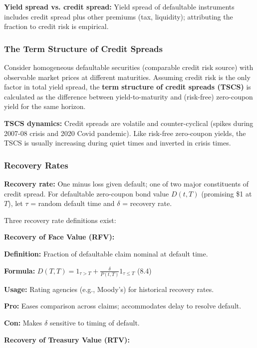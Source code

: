 \documentclass[12pt,a4paper]{article}
\begin{document}
\textbf{Yield spread vs. credit spread:} Yield spread of defaultable instruments includes credit spread plus other premiums (tax, liquidity); attributing the fraction to credit risk is empirical.

\subsubsection{The Term Structure of Credit Spreads}

Consider homogeneous defaultable securities (comparable credit risk source) with observable market prices at different maturities. Assuming credit risk is the only factor in total yield spread, the \textbf{term structure of credit spreads (TSCS)} is calculated as the difference between yield-to-maturity and (risk-free) zero-coupon yield for the same horizon.

\textbf{TSCS dynamics:} Credit spreads are volatile and counter-cyclical (spikes during 2007-08 crisis and 2020 Covid pandemic). Like risk-free zero-coupon yields, the TSCS is usually increasing during quiet times and inverted in crisis times.

\subsubsection{Recovery Rates}

\textbf{Recovery rate:} One minus loss given default; one of two major constituents of credit spread. For defaultable zero-coupon bond value $D(t,T)$ (promising \$1 at $T$), let $\tau$ = random default time and $\delta$ = recovery rate.

Three recovery rate definitions exist:

\vspace{0.3em}
\noindent\textbf{Recovery of Face Value (RFV):}

\textbf{Definition:} Fraction of defaultable claim nominal at default time.

\textbf{Formula:} $D(T,T) = 1_{\tau>T} + \frac{\delta}{P(t,T)} 1_{\tau \leq T}$ \quad (8.4)

\textbf{Usage:} Rating agencies (e.g., Moody's) for historical recovery rates.

\textbf{Pro:} Eases comparison across claims; accommodates delay to resolve default.

\textbf{Con:} Makes $\delta$ sensitive to timing of default.

\vspace{0.3em}
\noindent\textbf{Recovery of Treasury Value (RTV):}
\end{document}
